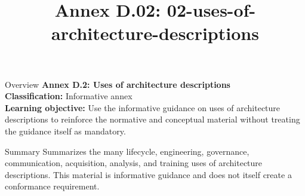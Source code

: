 \documentclass[10pt,letterpaper]{article}
\title{Annex D.02: 02-uses-of-architecture-descriptions}
\author{}
\date{}
\begin{document}
\maketitle
\begin{CornellOverviewBox}{Overview}
{\Large\bfseries\textcolor{CNavy}{Annex D.2: Uses of architecture descriptions}}\\[3pt]
{\small\textbf{Classification:} Informative annex}\\
{\small\textbf{Learning objective:} Use the informative guidance on uses of architecture descriptions to reinforce the normative and conceptual material without treating the guidance itself as mandatory.}
\end{CornellOverviewBox}
\vspace{3pt}

\begin{CornellNotesTable}
\end{CornellNotesTable}


\begin{CornellSummaryBox}{Summary}
Summarizes the many lifecycle, engineering, governance, communication, acquisition, analysis, and training uses of architecture descriptions. This material is informative guidance and does not itself create a conformance requirement.
\end{CornellSummaryBox}
\end{document}
